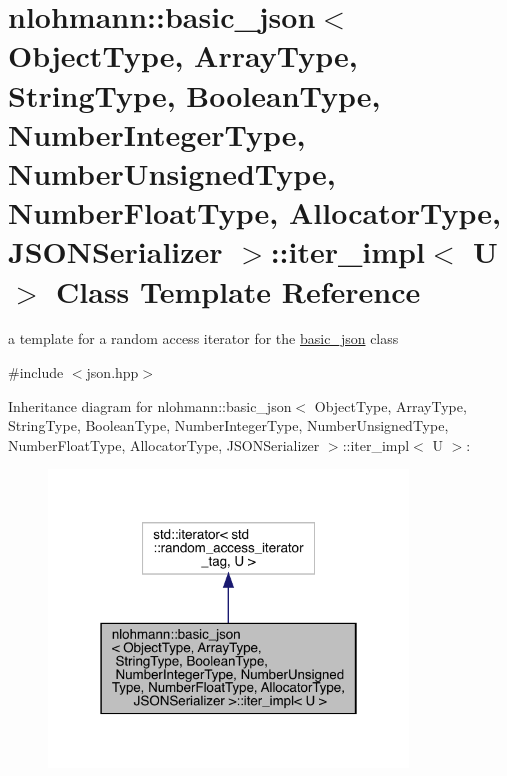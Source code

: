 \hypertarget{classnlohmann_1_1basic__json_1_1iter__impl}{}\section{nlohmann\+::basic\+\_\+json$<$ Object\+Type, Array\+Type, String\+Type, Boolean\+Type, Number\+Integer\+Type, Number\+Unsigned\+Type, Number\+Float\+Type, Allocator\+Type, J\+S\+O\+N\+Serializer $>$\+::iter\+\_\+impl$<$ U $>$ Class Template Reference}
\label{classnlohmann_1_1basic__json_1_1iter__impl}


a template for a random access iterator for the \mbox{\hyperlink{classnlohmann_1_1basic__json}{basic\+\_\+json}} class  




{\ttfamily \#include $<$json.\+hpp$>$}



Inheritance diagram for nlohmann\+::basic\+\_\+json$<$ Object\+Type, Array\+Type, String\+Type, Boolean\+Type, Number\+Integer\+Type, Number\+Unsigned\+Type, Number\+Float\+Type, Allocator\+Type, J\+S\+O\+N\+Serializer $>$\+::iter\+\_\+impl$<$ U $>$\+:\nopagebreak
\begin{figure}[H]
\begin{center}
\leavevmode
\includegraphics[width=271pt]{classnlohmann_1_1basic__json_1_1iter__impl__inherit__graph}
\end{center}
\end{figure}


